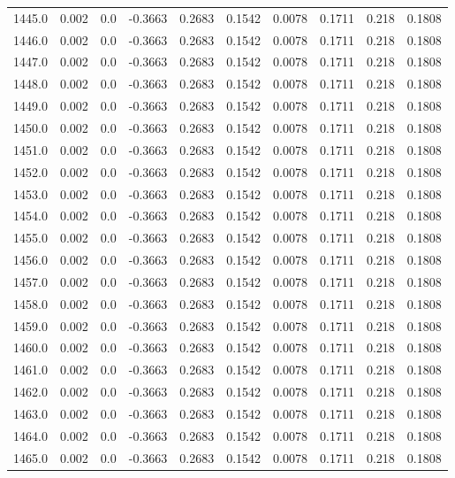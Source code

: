 \begin{longtable}{lrrrrrrrrr}
1445.0 & 0.002 & 0.0 & -0.3663 & 0.2683 & 0.1542 & 0.0078 & 0.1711 & 0.218 & 0.1808 \\
1446.0 & 0.002 & 0.0 & -0.3663 & 0.2683 & 0.1542 & 0.0078 & 0.1711 & 0.218 & 0.1808 \\
1447.0 & 0.002 & 0.0 & -0.3663 & 0.2683 & 0.1542 & 0.0078 & 0.1711 & 0.218 & 0.1808 \\
1448.0 & 0.002 & 0.0 & -0.3663 & 0.2683 & 0.1542 & 0.0078 & 0.1711 & 0.218 & 0.1808 \\
1449.0 & 0.002 & 0.0 & -0.3663 & 0.2683 & 0.1542 & 0.0078 & 0.1711 & 0.218 & 0.1808 \\
1450.0 & 0.002 & 0.0 & -0.3663 & 0.2683 & 0.1542 & 0.0078 & 0.1711 & 0.218 & 0.1808 \\
1451.0 & 0.002 & 0.0 & -0.3663 & 0.2683 & 0.1542 & 0.0078 & 0.1711 & 0.218 & 0.1808 \\
1452.0 & 0.002 & 0.0 & -0.3663 & 0.2683 & 0.1542 & 0.0078 & 0.1711 & 0.218 & 0.1808 \\
1453.0 & 0.002 & 0.0 & -0.3663 & 0.2683 & 0.1542 & 0.0078 & 0.1711 & 0.218 & 0.1808 \\
1454.0 & 0.002 & 0.0 & -0.3663 & 0.2683 & 0.1542 & 0.0078 & 0.1711 & 0.218 & 0.1808 \\
1455.0 & 0.002 & 0.0 & -0.3663 & 0.2683 & 0.1542 & 0.0078 & 0.1711 & 0.218 & 0.1808 \\
1456.0 & 0.002 & 0.0 & -0.3663 & 0.2683 & 0.1542 & 0.0078 & 0.1711 & 0.218 & 0.1808 \\
1457.0 & 0.002 & 0.0 & -0.3663 & 0.2683 & 0.1542 & 0.0078 & 0.1711 & 0.218 & 0.1808 \\
1458.0 & 0.002 & 0.0 & -0.3663 & 0.2683 & 0.1542 & 0.0078 & 0.1711 & 0.218 & 0.1808 \\
1459.0 & 0.002 & 0.0 & -0.3663 & 0.2683 & 0.1542 & 0.0078 & 0.1711 & 0.218 & 0.1808 \\
1460.0 & 0.002 & 0.0 & -0.3663 & 0.2683 & 0.1542 & 0.0078 & 0.1711 & 0.218 & 0.1808 \\
1461.0 & 0.002 & 0.0 & -0.3663 & 0.2683 & 0.1542 & 0.0078 & 0.1711 & 0.218 & 0.1808 \\
1462.0 & 0.002 & 0.0 & -0.3663 & 0.2683 & 0.1542 & 0.0078 & 0.1711 & 0.218 & 0.1808 \\
1463.0 & 0.002 & 0.0 & -0.3663 & 0.2683 & 0.1542 & 0.0078 & 0.1711 & 0.218 & 0.1808 \\
1464.0 & 0.002 & 0.0 & -0.3663 & 0.2683 & 0.1542 & 0.0078 & 0.1711 & 0.218 & 0.1808 \\
1465.0 & 0.002 & 0.0 & -0.3663 & 0.2683 & 0.1542 & 0.0078 & 0.1711 & 0.218 & 0.1808 \\

\end{longtable}
